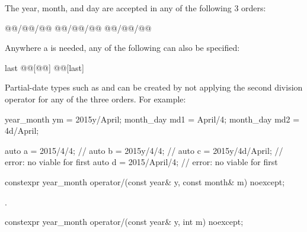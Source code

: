 \pnum
\begin{note}
The year, month, and day are accepted in any of the following 3 orders:

\begin{codeblock}
@@/@@/@@
@@/@@/@@
@@/@@/@@
\end{codeblock}

Anywhere a  is needed, any of the following can also be specified:

\begin{codeblock}
last
@@[@@]
@@[last]
\end{codeblock}
\end{note}

\pnum
\begin{note}
Partial-date types such as  and 
can be created by not applying the second division operator
for any of the three orders. For example:

\begin{codeblock}
year_month ym = 2015y/April;
month_day md1 = April/4;
month_day md2 = 4d/April;
\end{codeblock}
\end{note}

\pnum
\begin{example}
\begin{codeblock}
auto a = 2015/4/4;          // 
auto b = 2015y/4/4;         // 
auto c = 2015y/4d/April;    // error: no viable  for first \tcode{/}
auto d = 2015/April/4;      // error: no viable  for first \tcode{/}
\end{codeblock}
\end{example}

\begin{itemdecl}
constexpr year_month
  operator/(const year& y, const month& m) noexcept;
\end{itemdecl}

\begin{itemdescr}
\pnum
\returns
{}.
\end{itemdescr}

\begin{itemdecl}
constexpr year_month
  operator/(const year& y, int   m) noexcept;
\end{itemdecl}

